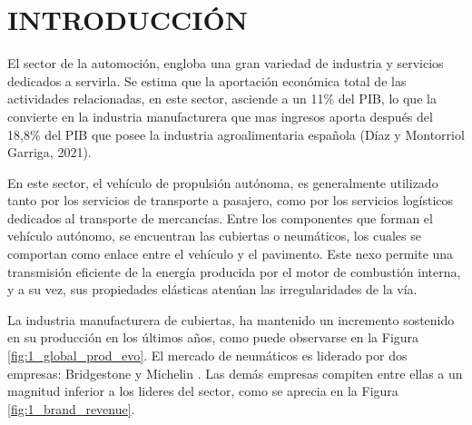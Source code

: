 
\section{INTRODUCCIÓN}\label{sec:intro}

El sector de la automoción,
engloba una gran variedad de industria y servicios dedicados a servirla.
Se estima que la aportación económica total de las actividades relacionadas,
en este sector, asciende a un 11\% del PIB,
lo que la convierte en la industria manufacturera que mas ingresos aporta
después  del 18,8\% del PIB que posee la industria agroalimentaria española
(Díaz y Montorriol Garriga, 2021).

En este sector, el vehículo de propulsión autónoma,
es generalmente utilizado tanto por los servicios de transporte a pasajero,
como por los servicios logísticos dedicados al transporte de mercancías.
Entre los componentes que forman el vehículo autónomo,
se encuentran las cubiertas o neumáticos,
los cuales se comportan como enlace entre el vehículo y el pavimento.
Este nexo permite una transmisión eficiente
de la energía producida por el motor de combustión interna,
y a su vez, sus propiedades elásticas atenúan las irregularidades de la vía.

La industria manufacturera de cubiertas,
ha mantenido un incremento sostenido en su producción en los últimos años,
como puede observarse en la Figura \ref{fig:1_global_prod_evo}.
El mercado de neumáticos es liderado por dos empresas: Bridgestone y Michelin
\citep{rodgers2020tire}.
Las demás empresas compiten entre ellas
a un magnitud inferior a los lideres del sector,
como se aprecia en la Figura \ref{fig:1_brand_revenue}.

